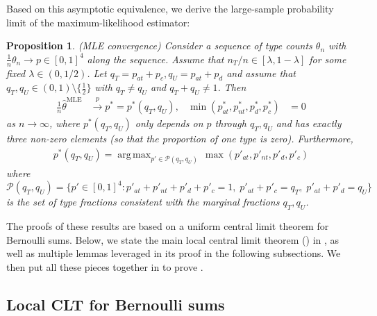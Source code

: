 \documentclass[12pt,reqno]{amsart}
\theoremstyle{theorem}
\newtheorem{prop}{Proposition}[section]
\theoremstyle{definition}
\newcommand{\0}{\mathbf{0}}
\newcommand{\1}{\mathbf{1}}
\DeclareMathOperator*{\argmax}{arg\,max}
\begin{document}
Based on this asymptotic equivalence, we derive the large-sample probability limit of the maximum-likelihood estimator:

\begin{prop}
\label{prop:mlefullconvergence}
\emph{(MLE convergence)}
Consider a sequence of type counts $\theta_n$ with $\tfrac{1}{n} \theta_n \rightarrow p \in [0,1]^4$ along the sequence. Assume that $n_T/n \in [\lambda, 1-\lambda]$ for some fixed $\lambda \in (0, 1/2)$. 
Let $q_T = p_{at} + p_c, q_U = p_{at} + p_d$ and assume that $q_T,q_U \in (0,1) \setminus \{\tfrac{1}{2}\}$ with $q_T \neq q_U$ and $q_T + q_U \neq 1$.
Then
\begin{align*}
    \tfrac{1}{n}\hat{\theta}^{\text{MLE}} &\xrightarrow{p} p^* = p^*(q_T,q_U),
    &
    \min(p^*_{at}, p^*_{nt}, p^*_d, p^*_c)
    &= 0
\end{align*}
as $n \rightarrow \infty$,
where $p^*(q_T,q_U)$ only depends on $p$ through $q_T,q_U$ and has exactly three non-zero elements (so that the proportion of one type is zero).
Furthermore,
\begin{align*}
p^*(q_T,q_U) = \argmax_{p' \in \mathcal{P}(q_T,q_U)}\, \max(p'_{at}, p'_{nt}, p'_d, p'_c)
\end{align*}
where
\(
\mathcal{P}(q_T,q_U) = \{p' \in [0,1]^4 : p'_{at} {+} p'_{nt} {+} p'_d {+} p'_c {=} 1,\; p'_{at} {+} p'_c {=} q_T,\; p'_{at} {+} p'_d {=} q_U\}
\)
is the set of type fractions consistent with the marginal fractions $q_T,q_U$. 
\end{prop}

The proofs of these results are based on a uniform central limit theorem for Bernoulli sums.
Below, we state the main local central limit theorem () in , as well as multiple lemmas leveraged in its proof in the following subsections. We then put all these pieces together in  to prove .


\subsection{Local CLT for Bernoulli sums}
\label{sec:localclt}
\end{document}
